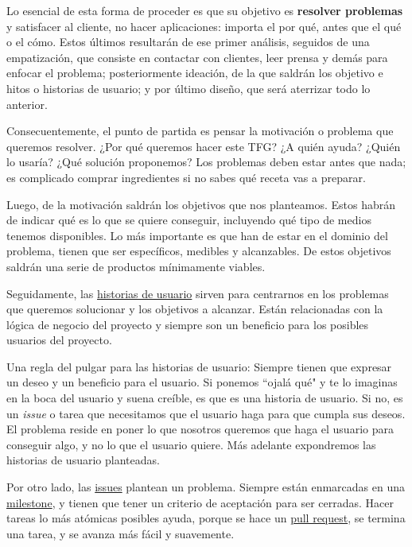 Lo esencial de esta forma de proceder es que su objetivo es \textbf{resolver problemas} y satisfacer 
al cliente, no hacer aplicaciones: importa el por qué, antes que el qué o el cómo. Estos 
últimos resultarán de ese primer análisis, seguidos de una empatización, que consiste 
en contactar con clientes, leer prensa y demás para enfocar el problema; posteriormente 
ideación, de la que saldrán los objetivo e hitos o historias de usuario; y por último diseño, 
que será aterrizar todo lo anterior. 

Consecuentemente, el punto de partida es pensar la motivación o problema que queremos resolver. 
¿Por qué queremos hacer este TFG? ¿A quién ayuda? ¿Quién lo usaría? ¿Qué solución proponemos? 
Los problemas deben estar antes que nada; es complicado comprar ingredientes si no sabes qué 
receta vas a preparar. 

Luego, de la motivación saldrán los objetivos que nos planteamos. Estos habrán de indicar 
qué es lo que se quiere conseguir, incluyendo qué tipo de medios tenemos disponibles. Lo 
más importante es que han de estar en el dominio del problema, tienen que ser específicos, 
medibles y alcanzables\cite{objetivos}. De estos objetivos saldrán una serie de productos 
mínimamente viables. 

Seguidamente, las \href{https://jj.github.io/curso-tdd/temas/dise%C3%B1o.html}{historias de usuario} sirven 
para centrarnos en los problemas que queremos solucionar 
y los objetivos a alcanzar. Están relacionadas con la lógica de 
negocio del proyecto y siempre son un beneficio para los posibles usuarios del proyecto.

Una regla del pulgar para las historias de usuario: Siempre tienen que expresar un deseo y un 
beneficio para el usuario. Si ponemos ``ojalá qué" y te lo imaginas en la boca del usuario y suena 
creíble, es que es una historia de usuario. Si no, es un \textit{issue} o tarea que necesitamos
que el usuario haga para que cumpla sus deseos. El problema reside en poner lo que nosotros queremos que 
haga el usuario para conseguir algo, y no lo que el usuario quiere. Más adelante expondremos las historias 
de usuario planteadas.

Por otro lado, las \href{https://docs.github.com/articles/about-issues}{issues} plantean un problema. 
Siempre están enmarcadas en una \href{https://docs.github.com/en/issues/using-labels-and-milestones-to-track-work/about-milestones}{milestone}, 
y tienen que tener un criterio de aceptación para ser cerradas. Hacer tareas lo más atómicas posibles ayuda, porque 
se hace un \href{https://docs.github.com/en/pull-requests/collaborating-with-pull-requests/proposing-changes-to-your-work-with-pull-requests/about-pull-requests}{pull request}, 
se termina una tarea, y se avanza más fácil y suavemente.

